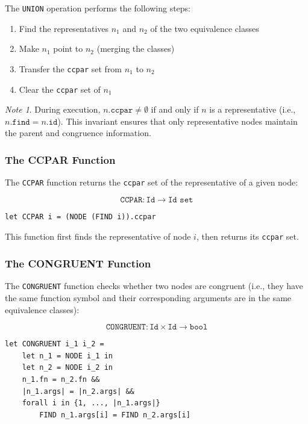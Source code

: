 \documentclass[11pt,a4paper]{article}
\theoremstyle{definition}
\theoremstyle{plain}
\theoremstyle{remark}
\newtheorem*{remark}{Note}
\begin{document}
The \texttt{UNION} operation performs the following steps:
\begin{enumerate}
    \item Find the representatives $n_1$ and $n_2$ of the two equivalence classes
    \item Make $n_1$ point to $n_2$ (merging the classes)
    \item Transfer the \texttt{ccpar} set from $n_1$ to $n_2$
    \item Clear the \texttt{ccpar} set of $n_1$
\end{enumerate}

\begin{remark}
During execution, $n.\texttt{ccpar} \neq \emptyset$ if and only if $n$ is a representative (i.e., $n.\texttt{find} = n.\texttt{id}$). This invariant ensures that only representative nodes maintain the parent and congruence information.
\end{remark}

\subsubsection{The CCPAR Function}

The \texttt{CCPAR} function returns the \texttt{ccpar} set of the representative of a given node:

\[
\texttt{CCPAR} : \texttt{Id} \rightarrow \texttt{Id set}
\]

\begin{verbatim}
let CCPAR i = (NODE (FIND i)).ccpar
\end{verbatim}

This function first finds the representative of node $i$, then returns its \texttt{ccpar} set.

\subsubsection{The CONGRUENT Function}

The \texttt{CONGRUENT} function checks whether two nodes are congruent (i.e., they have the same function symbol and their corresponding arguments are in the same equivalence classes):

\[
\texttt{CONGRUENT} : \texttt{Id} \times \texttt{Id} \rightarrow \texttt{bool}
\]

\begin{verbatim}
let CONGRUENT i_1 i_2 = 
    let n_1 = NODE i_1 in
    let n_2 = NODE i_2 in
    n_1.fn = n_2.fn && 
    |n_1.args| = |n_2.args| && 
    forall i in {1, ..., |n_1.args|} 
        FIND n_1.args[i] = FIND n_2.args[i]
\end{verbatim}
\end{document}
